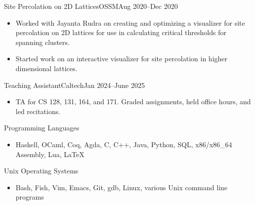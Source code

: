 \documentclass[a4paper,10pt]{article}
\begin{document}
    \begin{activity*}{Site Percolation on 2D Lattices}{OSSM}{Aug 2020--Dec 2020}
      \begin{itemize}[topsep=4pt, partopsep=0pt, itemsep=-2pt]
        \item Worked with Jayanta Rudra on creating and optimizing a visualizer for site percolation on 2D lattices for use in calculating critical thresholds for spanning clusters.
        \item Started work on an interactive visualizer for site percolation in higher dimensional lattices.
      \end{itemize}
    \end{activity*}

    \begin{description}[topsep=4pt, partopsep=0pt, itemsep=-2pt]
    \end{description}

    \begin{activity*}{Teaching Assistant}{Caltech}{Jan 2024--June 2025}
      \begin{itemize}[label={}, nosep]
        \item TA for CS 128, 131, 164, and 171. Graded assignments, held office hours, and led recitations.
      \end{itemize}
    \end{activity*}

    \begin{skill}{Programming Languages}
      \begin{itemize}[label={},topsep=4pt, partopsep=0pt, itemsep=-2pt]
        \item Haskell, OCaml, Coq, Agda, C, C++, Java, Python, SQL, x86/x86\_64 Assembly, Lua, \LaTeX{}
      \end{itemize}
    \end{skill}

    \begin{skill}{Unix Operating Systems}
      \begin{itemize}[label={}, topsep=4pt, partopsep=0pt, itemsep=-2pt]
        \item Bash, Fish, Vim, Emacs, Git, gdb, Linux, various Unix command line programs
     \end{itemize}
    \end{skill}
\end{document}
